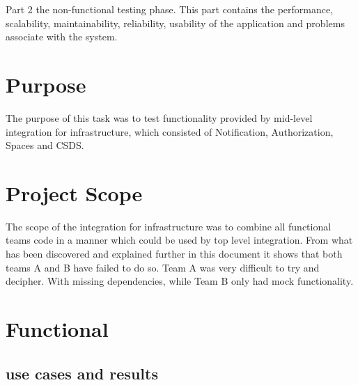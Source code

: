 \documentclass[12pt]{article}
\begin{document}
Part 2 the non-functional testing phase.
This part contains the performance, scalability, maintainability, reliability, usability of the application and problems associate with the system.

\section{Purpose} %
The purpose of this task was to test functionality provided by mid-level integration for infrastructure, which consisted of Notification, Authorization, Spaces and CSDS.


\section{Project Scope} %
The scope of the integration for infrastructure was to combine all functional teams code in a manner which could be used by top level integration. From what has been discovered and explained further in this document it shows that both teams A and B have failed to do so. Team A was very difficult to try and decipher. With missing dependencies, while Team B only had mock functionality.

\section{Functional} %
\subsection{use cases and results}
\end{document}
